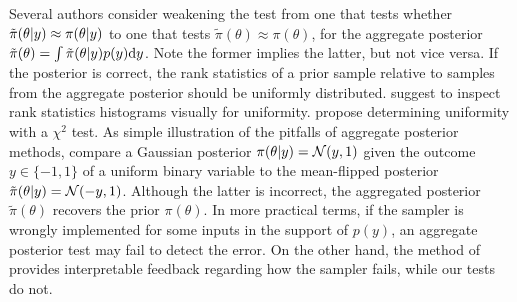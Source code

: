 \documentclass{article}
\newcommand{\tildepi}{\tilde{\pi}}
\begin{document}
Several authors consider weakening the test from one that tests whether $\tildepi(\theta\given y)\approx\pi(\theta\given y)$ to one that tests
$\tildepi(\theta)\approx\pi(\theta)$, for the aggregate posterior $\tildepi(\theta)=\int \tildepi(\theta\given y)p(y)\dd y$. Note the former implies the latter, but not vice versa.
If the posterior is correct, the rank statistics of a prior sample relative to samples from the aggregate posterior should be uniformly distributed.
\citet{talts_validating_2018} suggest to inspect rank statistics histograms visually for uniformity. 
\citet{gandy_unit_2020} propose determining uniformity with a $\chi^2$ test. As simple illustration of the pitfalls of aggregate posterior 
methods, compare a Gaussian posterior $\pi(\theta\vert y) = \mathcal{N}(y, 1)$ given the outcome $y\in \{-1, 1\}$ of a uniform binary variable to the mean-flipped posterior $\tildepi(\theta\given y) = \mathcal{N}(-y, 1)$. 
Although the latter is incorrect, the aggregated posterior $\tildepi(\theta)$ recovers the prior $\pi(\theta).$
In more practical terms, if the sampler is wrongly implemented for some inputs in the support of $p(y)$, an aggregate posterior test may fail to detect the error.
On the other hand, the method of \citet{talts_validating_2018} provides interpretable feedback regarding how the sampler fails, while our tests do not.
\end{document}
